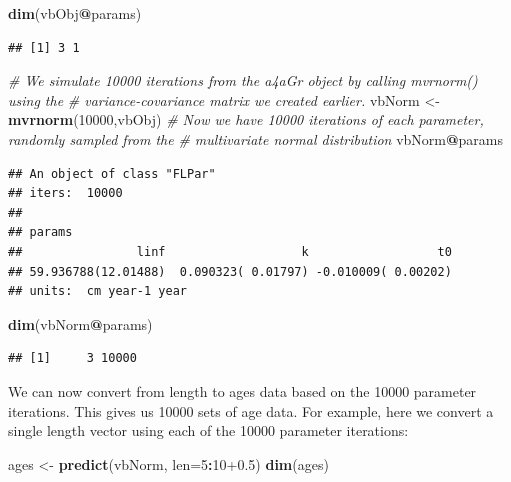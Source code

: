 \documentclass[
]{book}
\newenvironment{Shaded}{\begin{snugshade}}{\end{snugshade}}
\newcommand{\AttributeTok}[1]{\textcolor[rgb]{0.13,0.29,0.53}{#1}}
\newcommand{\CommentTok}[1]{\textcolor[rgb]{0.56,0.35,0.01}{\textit{#1}}}
\newcommand{\DecValTok}[1]{\textcolor[rgb]{0.00,0.00,0.81}{#1}}
\newcommand{\FloatTok}[1]{\textcolor[rgb]{0.00,0.00,0.81}{#1}}
\newcommand{\FunctionTok}[1]{\textcolor[rgb]{0.13,0.29,0.53}{\textbf{#1}}}
\newcommand{\NormalTok}[1]{#1}
\newcommand{\OtherTok}[1]{\textcolor[rgb]{0.56,0.35,0.01}{#1}}
\newcommand{\SpecialCharTok}[1]{\textcolor[rgb]{0.81,0.36,0.00}{\textbf{#1}}}
\begin{document}
\begin{Shaded}
\begin{Highlighting}[]
\FunctionTok{dim}\NormalTok{(vbObj}\SpecialCharTok{@}\NormalTok{params)}
\end{Highlighting}
\end{Shaded}

\begin{verbatim}
## [1] 3 1
\end{verbatim}

\begin{Shaded}
\begin{Highlighting}[]
\CommentTok{\# We simulate 10000 iterations from the a4aGr object by calling mvrnorm() using the }
\CommentTok{\# variance{-}covariance matrix we created earlier.}
\NormalTok{vbNorm }\OtherTok{\textless{}{-}} \FunctionTok{mvrnorm}\NormalTok{(}\DecValTok{10000}\NormalTok{,vbObj)}
\CommentTok{\# Now we have 10000 iterations of each parameter, randomly sampled from the }
\CommentTok{\# multivariate normal distribution}
\NormalTok{vbNorm}\SpecialCharTok{@}\NormalTok{params}
\end{Highlighting}
\end{Shaded}

\begin{verbatim}
## An object of class "FLPar"
## iters:  10000 
## 
## params
##                linf                   k                  t0 
## 59.936788(12.01488)  0.090323( 0.01797) -0.010009( 0.00202) 
## units:  cm year-1 year
\end{verbatim}

\begin{Shaded}
\begin{Highlighting}[]
\FunctionTok{dim}\NormalTok{(vbNorm}\SpecialCharTok{@}\NormalTok{params)}
\end{Highlighting}
\end{Shaded}

\begin{verbatim}
## [1]     3 10000
\end{verbatim}

We can now convert from length to ages data based on the 10000 parameter iterations. This gives us 10000 sets of age data. For example, here we convert a single length vector using each of the 10000 parameter iterations:

\begin{Shaded}
\begin{Highlighting}[]
\NormalTok{ages }\OtherTok{\textless{}{-}} \FunctionTok{predict}\NormalTok{(vbNorm, }\AttributeTok{len=}\DecValTok{5}\SpecialCharTok{:}\DecValTok{10}\FloatTok{+0.5}\NormalTok{)}
\FunctionTok{dim}\NormalTok{(ages)}
\end{Highlighting}
\end{Shaded}
\end{document}
